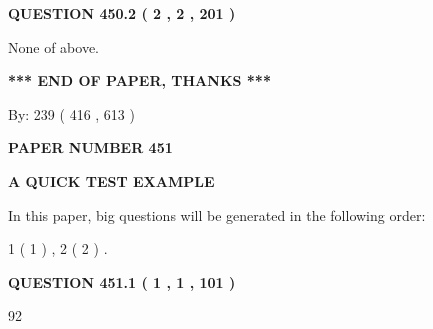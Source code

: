 \documentclass[12pt]{article}
\begin{document}
{\textbf{\Large{QUESTION
450.2 
 ( 2 , 2 , 201 )
}}}
  
  
 
 
\noindent{}
 
 
 None of above.
 
 
 
 
   
   
 \vspace{0.2in}
 
   
   
   
   
\vspace{1.0in} 
{\textbf{\large{ *** END OF PAPER, THANKS *** }}} 
   
   
\hspace{1.0in} By: 
 239 ( 416 ,  613 )
   
   
   
   
\newpage 
\setcounter{page}{ 
   451001 } 
   
   
   
   
 {\textbf{ \Large{ PAPER NUMBER  451  }}}
   
   
\vspace{0.2in}
   
   
   
   
   
   
 \vspace{0.2in}
{\LARGE {\textbf{ A QUICK TEST EXAMPLE}}}
   
   
   
\vspace{0.2in}
   
In this paper, big questions will be generated in the following order: 
   
   
   1 ( 1 )
 ,
   2 ( 2 )
 .
  
\vspace{0.2in}
  
{\textbf{\Large{QUESTION
451.1 
 ( 1 , 1 , 101 )
}}}
  
  
 
 
\noindent{}

92
 
 
 
 
\noindent{}
\end{document}
